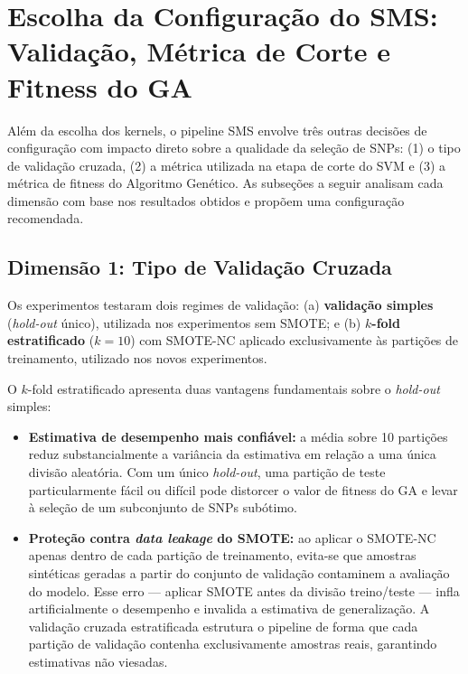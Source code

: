 \documentclass[12pt,a4paper]{article}
\newcommand{\novo}[1]{\textcolor{corNova}{#1}}
\begin{document}
\section*{\novo{Escolha da Configuração do SMS: Validação, Métrica de Corte e Fitness do GA}}

\novo{Além da escolha dos kernels, o pipeline SMS envolve três outras decisões de configuração com impacto direto sobre a qualidade da seleção de SNPs: (1) o tipo de validação cruzada, (2) a métrica utilizada na etapa de corte do SVM e (3) a métrica de fitness do Algoritmo Genético. As subseções a seguir analisam cada dimensão com base nos resultados obtidos e propõem uma configuração recomendada.}

\subsection*{\novo{Dimensão 1: Tipo de Validação Cruzada}}

\novo{Os experimentos testaram dois regimes de validação: (a) \textbf{validação simples} (\textit{hold-out} único), utilizada nos experimentos sem SMOTE; e (b) \textbf{$k$-fold estratificado} ($k = 10$) com SMOTE-NC aplicado exclusivamente às partições de treinamento, utilizado nos novos experimentos.}

\novo{O $k$-fold estratificado apresenta duas vantagens fundamentais sobre o \textit{hold-out} simples:}
\begin{itemize}
  \item \novo{\textbf{Estimativa de desempenho mais confiável:} a média sobre 10 partições reduz substancialmente a variância da estimativa em relação a uma única divisão aleatória. Com um único \textit{hold-out}, uma partição de teste particularmente fácil ou difícil pode distorcer o valor de fitness do GA e levar à seleção de um subconjunto de SNPs subótimo.}
  \item \novo{\textbf{Proteção contra \textit{data leakage} do SMOTE:} ao aplicar o SMOTE-NC apenas dentro de cada partição de treinamento, evita-se que amostras sintéticas geradas a partir do conjunto de validação contaminem a avaliação do modelo. Esse erro --- aplicar SMOTE antes da divisão treino/teste --- infla artificialmente o desempenho e invalida a estimativa de generalização. A validação cruzada estratificada estrutura o pipeline de forma que cada partição de validação contenha exclusivamente amostras reais, garantindo estimativas não viesadas.}
\end{itemize}
\end{document}

